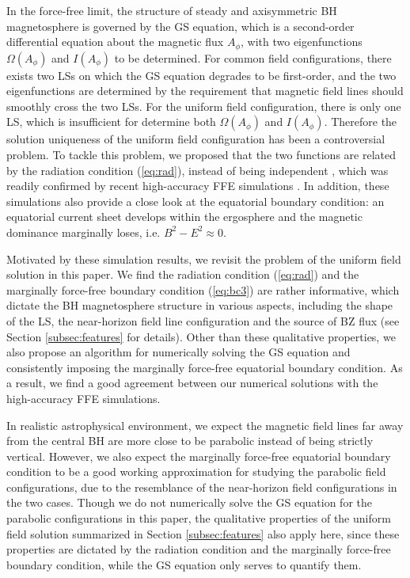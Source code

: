 \documentclass[aps,prd,reprint,nofootinbib, superscriptaddress]{revtex4-1}
\def\Ap{A_\phi}
\begin{document}
In the force-free limit, the structure of steady and axisymmetric BH magnetosphere is governed by
the GS equation, which is a second-order differential equation about the magnetic flux $\Ap$, with two
eigenfunctions $\Omega(\Ap)$ and $I(\Ap)$ to be determined. For common field configurations, there exists
two LSs on which the GS equation degrades to be first-order, and the two eigenfunctions are determined
by the requirement that magnetic field lines should smoothly cross the two LSs.
For the uniform field configuration, there is only one
LS, which is insufficient for determine both  $\Omega(\Ap)$ and $I(\Ap)$.
Therefore the solution uniqueness of the uniform field configuration has been a controversial problem.
To tackle this problem, we  proposed that the two functions are related by the radiation condition (\ref{eq:rad}),
instead of being independent \cite{Pan2017}, which was readily confirmed by recent high-accuracy
FFE simulations \cite{East2018}. In addition, these simulations also provide a close look at the
equatorial boundary condition: an equatorial current sheet develops within the ergosphere and the magnetic dominance marginally loses, i.e. $B^2-E^2\approx 0$.

Motivated by these simulation results, we revisit the problem of the uniform field solution in this paper.
We find the radiation condition (\ref{eq:rad}) and the marginally force-free boundary
condition (\ref{eq:bc3}) are rather informative, which dictate the BH magnetosphere structure
in various aspects, including the shape of the LS, the near-horizon field line configuration and
the source of BZ flux (see Section \ref{subsec:features} for details). Other than these qualitative properties,
we also propose an algorithm for numerically solving the GS equation and consistently imposing
the marginally force-free equatorial boundary condition. As a result, we find a good agreement
between our numerical solutions with the high-accuracy FFE simulations.

In realistic astrophysical environment, we expect the magnetic field lines far away from the central BH
are more close to be parabolic instead of being strictly vertical. However, we also expect the marginally
force-free equatorial boundary condition to be a good working approximation for studying the parabolic field configurations,
due to the resemblance of the near-horizon field configurations in the two cases.
Though we do not numerically solve the GS equation for the parabolic configurations in this paper, the qualitative
properties of the uniform field solution summarized in Section \ref{subsec:features} also apply here,
since these properties are dictated by the radiation condition
and the marginally force-free boundary condition, while the GS equation only serves to quantify them.
\end{document}
